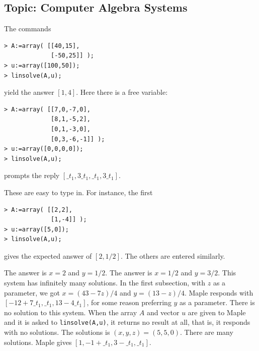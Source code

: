 \subsection{Topic: Computer Algebra Systems}
\begin{ans}{1}
      \begin{exparts}
        \partsitem The commands
\begin{indented}{\small
\begin{verbatim}
> A:=array( [[40,15],
             [-50,25]] );
> u:=array([100,50]);
> linsolve(A,u);
\end{verbatim}
}\end{indented}
           yield the answer $[1,4]$.
        \partsitem Here there is a free variable:
\begin{indented}{\small
\begin{verbatim}
> A:=array( [[7,0,-7,0],
             [8,1,-5,2],
             [0,1,-3,0],
             [0,3,-6,-1]] );
> u:=array([0,0,0,0]);
> linsolve(A,u);
\end{verbatim}
}\end{indented}
         prompts the reply $[\_t_1,3\_t_1,\_t_1,3\_t_1]$.
      \end{exparts}
    
\end{ans}
\begin{ans}{2}
      These are easy to type in.
      For instance, the first
\begin{indented}{\small
\begin{verbatim}
> A:=array( [[2,2],
             [1,-4]] );
> u:=array([5,0]);
> linsolve(A,u);
\end{verbatim}
}\end{indented}
      gives the expected answer of $[2,1/2]$.
      The others are entered similarly.
      \begin{exparts}
        \partsitem The answer is \( x=2 \) and \( y=1/2 \).
        \partsitem The answer is \( x=1/2 \) and \( y=3/2 \).
        \partsitem This system has infinitely many solutions.
           In the first subsection, with $z$ as a parameter,
           we got $x=(43-7z)/4$ and $y=(13-z)/4$.
           Maple responds with $[-12+7\_t_1,\_t_1,13-4\_t_1]$,
           for some reason preferring $y$ as a parameter.
        \partsitem There is no solution to this system.
           When the array $A$ and vector $u$ are given to Maple
           and it is asked to \texttt{linsolve(A,u)},
           it returns no result at all, that is, it responds with
           no solutions.
        \partsitem The solutions is \( (x,y,z)=(5,5,0) \).
        \partsitem There are many solutions.
           Maple gives $[1,-1+\_t_1,3-\_t_1,\_t_1]$.
      \end{exparts}
    
\end{ans}
